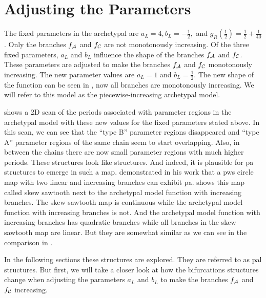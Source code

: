 \section{Adjusting the Parameters}
\label{sec:add.parameters}

The fixed parameters in the archetypal are $a_L = 4, b_L = -\frac{1}{2},$ and $g_R\left(\frac{1}{2}\right) = \frac{1}{2} + \frac{1}{40}$.
Only the branches $f_{\mathcal{A}}$ and $f_{\mathcal{C}}$ are not monotonously increasing.
Of the three fixed parameters, $a_L$ and $b_L$ influence the shape of the branches $f_{\mathcal{A}}$ and $f_{\mathcal{C}}$.
These parameters are adjusted to make the branches $f_{\mathcal{A}}$ and $f_{\mathcal{C}}$ monotonously increasing.
The new parameter values are $a_L = 1$ and $b_L = \frac{1}{2}$.
The new shape of the function can be seen in , now all branches are monotonously increasing.
We will refer to this model as the piecewise-increasing archetypal model.

 shows a 2D scan of the periods associated with parameter regions in the archetypal model with these new values for the fixed parameters stated above.
In this scan, we can see that the ``type B'' parameter regions disappeared and ``type A'' parameter regions of the same chain seem to start overlapping.
Also, in between the chains there are now small parameter regions with much higher periods.
These structures look like  structures.
And indeed, it is plausible for \gls{pa} structures to emerge in such a map.
 demonstrated in his work \cite{simpson2018saw} that a \gls{pws} circle map with two linear and increasing branches can exhibit \gls{pa}.
 shows this map called skew sawtooth next to the archetypal model function with increasing branches.
The skew sawtooth map is continuous while the archetypal model function with increasing branches is not.
And the archetypal model function with increasing branches has quadratic branches while all branches in the skew sawtooth map are linear.
But they are somewhat similar as we can see in the comparison in .

In the following sections these structures are explored.
They are referred to as \gls{pal} structures.
But first, we will take a closer look at how the bifurcations structures change when adjusting the parameters $a_L$ and $b_L$ to make the branches $f_{\mathcal{A}}$ and $f_{\mathcal{C}}$ increasing.

